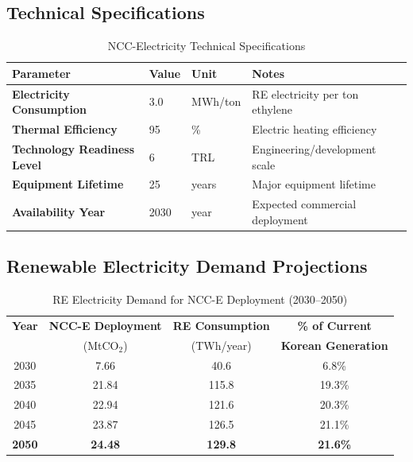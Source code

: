 \documentclass[11pt,a4paper]{report}
\newcommand{\mtco}{MtCO$_2$}
\begin{document}
\subsection{Technical Specifications}

\begin{table}[H]
\centering
\caption{NCC-Electricity Technical Specifications}
\begin{tabular}{p{6cm}p{3cm}p{2cm}p{4cm}}
\toprule
\textbf{Parameter} & \textbf{Value} & \textbf{Unit} & \textbf{Notes} \\
\midrule
\textbf{Electricity Consumption} & 3.0 & MWh/ton & RE electricity per ton ethylene \\
\textbf{Thermal Efficiency} & 95 & \% & Electric heating efficiency \\
\textbf{Technology Readiness Level} & 6 & TRL & Engineering/development scale \\
\textbf{Equipment Lifetime} & 25 & years & Major equipment lifetime \\
\textbf{Availability Year} & 2030 & year & Expected commercial deployment \\
\bottomrule
\end{tabular}
\label{tab:ncce-specs}
\end{table}

\subsection{Renewable Electricity Demand Projections}

\begin{table}[H]
\centering
\caption{RE Electricity Demand for NCC-E Deployment (2030--2050)}
\begin{tabular}{cccc}
\toprule
\textbf{Year} & \textbf{NCC-E Deployment} & \textbf{RE Consumption} & \textbf{\% of Current} \\
 & (\mtco) & (TWh/year) & \textbf{Korean Generation} \\
\midrule
2030 & 7.66 & 40.6 & 6.8\% \\
2035 & 21.84 & 115.8 & 19.3\% \\
2040 & 22.94 & 121.6 & 20.3\% \\
2045 & 23.87 & 126.5 & 21.1\% \\
\rowcolor{lightgray}
\textbf{2050} & \textbf{24.48} & \textbf{129.8} & \textbf{21.6\%} \\
\bottomrule
\end{tabular}
\label{tab:ncce-re-demand}
\end{table}
\end{document}
